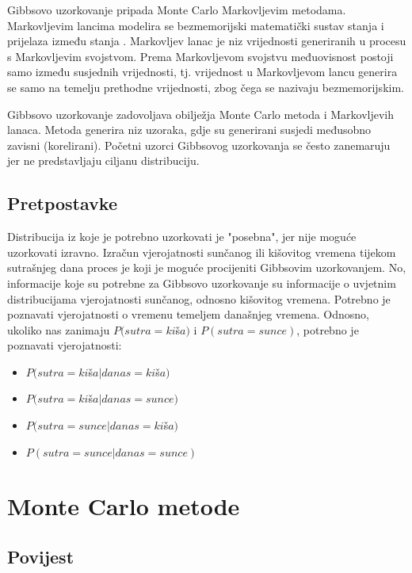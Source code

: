 Gibbsovo uzorkovanje pripada Monte Carlo Markovljevim  metodama. Markovljevim lancima modelira se bezmemorijski matematički sustav stanja i prijelaza između stanja \citep{kass1998markov}. Markovljev lanac je niz vrijednosti generiranih u procesu s Markovljevim svojstvom. Prema Markovljevom svojstvu međuovisnost postoji samo između susjednih vrijednosti, tj. vrijednost u Markovljevom lancu generira se samo na temelju prethodne vrijednosti, zbog čega se nazivaju bezmemorijskim. 

Gibbsovo uzorkovanje zadovoljava obilježja Monte Carlo metoda i Markovljevih lanaca. Metoda generira niz uzoraka, gdje su generirani susjedi međusobno zavisni (korelirani). Početni uzorci  Gibbsovog uzorkovanja se često zanemaruju jer ne predstavljaju ciljanu distribuciju.



\section{Pretpostavke}

Distribucija iz koje je potrebno uzorkovati je "posebna", jer nije moguće uzorkovati izravno. Izračun vjerojatnosti sunčanog ili kišovitog vremena tijekom sutrašnjeg dana proces je koji je moguće procijeniti Gibbsovim uzorkovanjem. No, informacije koje su potrebne za Gibbsovo uzorkovanje su informacije o uvjetnim distribucijama vjerojatnosti sunčanog, odnosno kišovitog vremena. Potrebno je poznavati vjerojatnosti o vremenu temeljem današnjeg vremena. Odnosno, ukoliko nas zanimaju $P(sutra = ki$š$a)$ i $P(sutra = sunce)$, potrebno je poznavati vjerojatnosti:
\begin{itemize}
\item $P(sutra = ki$š$a | danas = ki$š$a)$
\item $P(sutra = ki$š$a | danas = sunce)$
\item $P(sutra = sunce | danas = ki$š$a)$
\item $P(sutra = sunce | danas = sunce)$
\end{itemize}



\chapter{Monte Carlo metode}

\section{Povijest}

